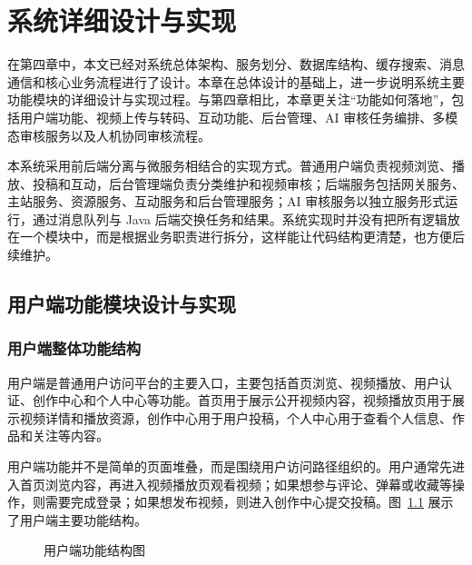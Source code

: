 
\chapter{系统详细设计与实现}
\label{chap:detail-design-implementation}

在第四章中，本文已经对系统总体架构、服务划分、数据库结构、缓存搜索、消息通信和核心业务流程进行了设计。本章在总体设计的基础上，进一步说明系统主要功能模块的详细设计与实现过程。与第四章相比，本章更关注“功能如何落地”，包括用户端功能、视频上传与转码、互动功能、后台管理、AI 审核任务编排、多模态审核服务以及人机协同审核流程。

本系统采用前后端分离与微服务相结合的实现方式。普通用户端负责视频浏览、播放、投稿和互动，后台管理端负责分类维护和视频审核；后端服务包括网关服务、主站服务、资源服务、互动服务和后台管理服务；AI 审核服务以独立服务形式运行，通过消息队列与 Java 后端交换任务和结果。系统实现时并没有把所有逻辑放在一个模块中，而是根据业务职责进行拆分，这样能让代码结构更清楚，也方便后续维护。

\section{用户端功能模块设计与实现}
\label{sec:user-module-implementation}

\subsection{用户端整体功能结构}
\label{subsec:user-module-structure}

用户端是普通用户访问平台的主要入口，主要包括首页浏览、视频播放、用户认证、创作中心和个人中心等功能。首页用于展示公开视频内容，视频播放页用于展示视频详情和播放资源，创作中心用于用户投稿，个人中心用于查看个人信息、作品和关注等内容。

用户端功能并不是简单的页面堆叠，而是围绕用户访问路径组织的。用户通常先进入首页浏览内容，再进入视频播放页观看视频；如果想参与评论、弹幕或收藏等操作，则需要完成登录；如果想发布视频，则进入创作中心提交投稿。图~\ref{fig:user-module-structure} 展示了用户端主要功能结构。

\begin{figure}[htbp]
  \centering
  \caption{用户端功能结构图}
  \label{fig:user-module-structure}
\end{figure}

